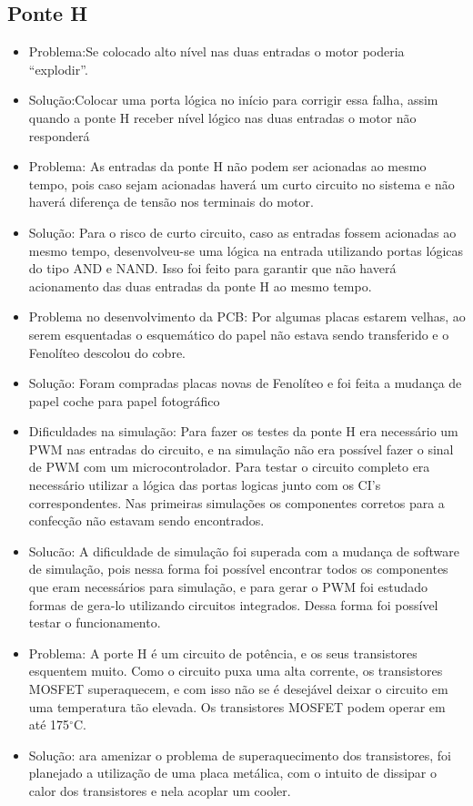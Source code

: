 \subsection{Ponte H}
 \begin{itemize}
    \item Problema:Se colocado alto nível nas duas entradas o motor poderia “explodir”.
	  \item Solução:Colocar uma porta lógica no início para corrigir essa falha, assim quando a ponte H receber nível lógico nas duas entradas o motor não responderá

    \item Problema: As entradas da ponte H não podem ser acionadas ao mesmo tempo, pois caso sejam acionadas haverá um curto circuito no sistema e não haverá diferença de tensão nos terminais do motor.
    \item Solução: Para o risco de curto circuito, caso as entradas fossem acionadas ao mesmo tempo, desenvolveu-se uma lógica na entrada utilizando portas lógicas do tipo AND e NAND. Isso foi feito para garantir que não haverá acionamento das duas entradas da ponte H ao mesmo tempo.

    \item Problema no desenvolvimento da PCB: Por algumas placas estarem velhas, ao serem esquentadas o esquemático do papel não estava sendo transferido e o Fenolíteo descolou do cobre.
    \item Solução: Foram compradas placas novas de Fenolíteo e foi feita a mudança de papel coche para papel fotográfico

    \item Dificuldades na simulação: Para fazer os testes da ponte H era necessário um PWM nas entradas do circuito, e na simulação não era possível fazer o sinal de PWM com um microcontrolador. Para testar o circuito completo era necessário utilizar a lógica das portas logicas junto com os CI’s correspondentes. Nas primeiras simulações os componentes corretos para a confecção não estavam sendo encontrados.
    \item Solucão: A dificuldade de simulação foi superada com a mudança de software de simulação, pois nessa forma foi possível encontrar todos os componentes que eram necessários para simulação, e para gerar o PWM foi estudado formas de gera-lo utilizando circuitos integrados. Dessa forma foi possível testar o funcionamento.

    \item Problema: A porte H é um circuito de potência, e os seus transistores esquentem muito. Como o circuito puxa uma alta corrente, os transistores MOSFET superaquecem, e com isso não se é desejável deixar o circuito em uma temperatura tão elevada. Os transistores MOSFET podem operar em até 175$^{\circ}$C.
    \item Solução: ara amenizar o problema de superaquecimento dos transistores, foi planejado a utilização de uma placa metálica, com o intuito de dissipar o calor dos transistores e nela acoplar um cooler.

    \end{itemize}

